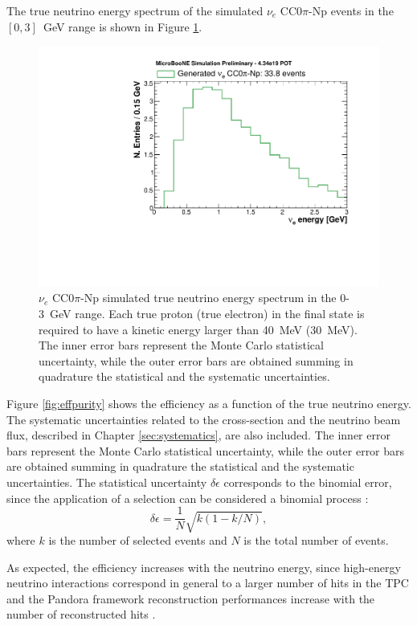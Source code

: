 The true neutrino energy spectrum of the simulated $\nu_{e}$ CC$0\pi$-Np events in the $[0,3]$~GeV range is shown in Figure \ref{fig:true_energy}.

\begin{figure}
\centering
  \includegraphics[width=0.8\linewidth]{figures/tot.pdf}
  \caption{$\nu_{e}$ CC$0\pi$-Np simulated true neutrino energy spectrum in the 0-3~GeV range. Each true proton (true electron) in the final state is required to have a kinetic energy larger than 40~MeV (30~MeV). The inner error bars represent the Monte Carlo statistical uncertainty, while the outer error bars are obtained summing in quadrature the statistical and the systematic uncertainties.}
  \label{fig:true_energy}
\end{figure}

Figure \ref{fig:effpurity} shows the efficiency as a function of the true neutrino energy.
The systematic uncertainties related to the cross-section and the neutrino beam flux, described in Chapter \ref{sec:systematics}, are also included. The inner error bars represent the Monte Carlo statistical uncertainty, while the outer error bars are obtained summing in quadrature the statistical and the systematic uncertainties. The statistical uncertainty $\delta\epsilon$ corresponds to the binomial error, since the application of a selection can be considered a binomial process \cite{Paterno:2004cb}:
\begin{equation}
    \delta\epsilon = \frac{1}{N}\sqrt{k(1-k/N)},
\end{equation}
where $k$ is the number of selected events and $N$ is the total number of events.

As expected, the efficiency increases with the neutrino energy, since high-energy neutrino interactions correspond in general to a larger number of hits in the TPC and the Pandora framework reconstruction performances increase with the number of reconstructed hits \cite{Acciarri:2017hat}. 

